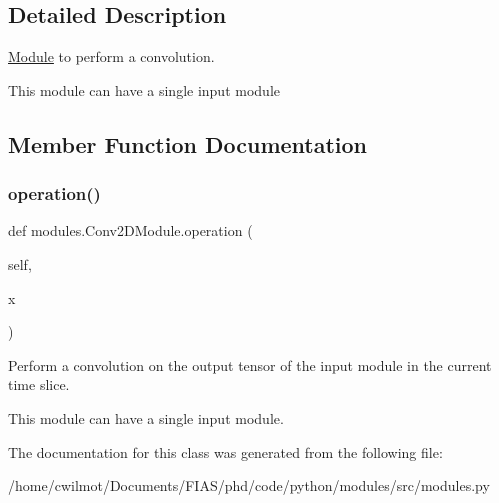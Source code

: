 \subsection{Detailed Description}
\hyperlink{classmodules_1_1_module}{Module} to perform a convolution. 

This module can have a single input module 

\subsection{Member Function Documentation}
\mbox{\label{classmodules_1_1_conv2_d_module_a076958c1410647dd4e7982c61c72585f}} 
\subsubsection{\texorpdfstring{operation()}{operation()}}
{\footnotesize\ttfamily def modules.\+Conv2\+D\+Module.\+operation (\begin{DoxyParamCaption}\item[{}]{self,  }\item[{}]{x }\end{DoxyParamCaption})}



Perform a convolution on the output tensor of the input module in the current time slice. 

This module can have a single input module. 

The documentation for this class was generated from the following file\+:\begin{DoxyCompactItemize}
\item 
/home/cwilmot/\+Documents/\+F\+I\+A\+S/phd/code/python/modules/src/modules.\+py\end{DoxyCompactItemize}
